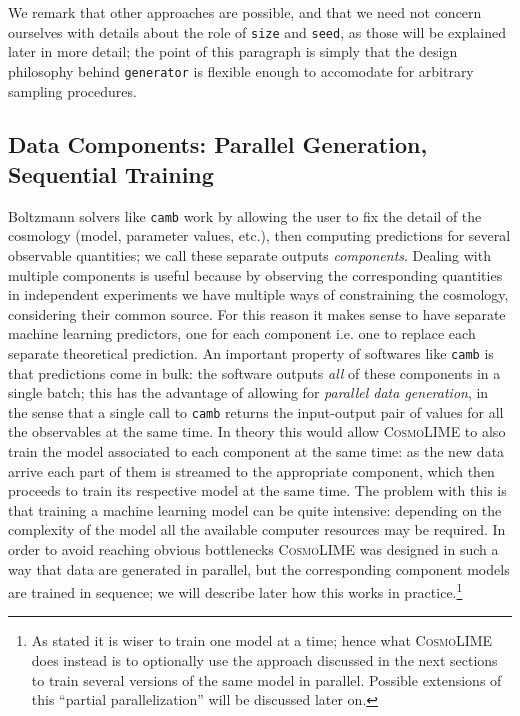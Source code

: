 We remark that other approaches are possible, and that we need not concern ourselves with details about the role of \texttt{size} and \texttt{seed}, as those will be explained later in more detail; the point of this paragraph is simply that the design philosophy behind \texttt{generator} is flexible enough to accomodate for arbitrary sampling procedures.

\subsection{Data Components: Parallel Generation, Sequential Training}\label{subsec:data_components_generator}
Boltzmann solvers like \texttt{camb} \cite{camb} work by allowing the user to fix the detail of the cosmology (model, parameter values, etc.), then computing predictions for several observable quantities; we call these separate outputs \emph{components}. Dealing with multiple components is useful because by observing the corresponding quantities in independent experiments we have multiple ways of constraining the cosmology, considering their common source. For this reason it makes sense to have separate machine learning predictors, one for each component i.e. one to replace each separate theoretical prediction. 
An important property of softwares like \texttt{camb} is that predictions come in bulk: the software outputs \emph{all} of these components in a single batch; this has the advantage of allowing for \emph{parallel data generation}, in the sense that a single call to \texttt{camb} returns the input-output pair of values for all the observables at the same time. In theory this would allow \textsc{CosmoLIME} to also train the model associated to each component at the same time: as the new data arrive each part of them is streamed to the appropriate component, which then proceeds to train its respective model at the same time. The problem with this is that training a machine learning model can be quite intensive: depending on the complexity of the model all the available computer resources may be required. In order to avoid reaching obvious bottlenecks \textsc{CosmoLIME} was designed in such a way that data are generated in parallel, but the corresponding component models are trained in sequence; we will describe later how this works in practice.\footnote{As stated it is wiser to train one model at a time; hence what \textsc{CosmoLIME} does instead is to optionally use the approach discussed in the next sections to train several versions of the same model in parallel. Possible extensions of this ``partial parallelization'' will be discussed later on.}

